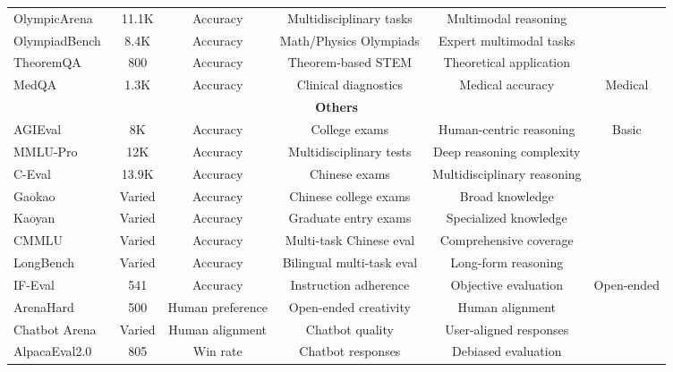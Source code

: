 \begin{table*}[!ht]
\begin{adjustbox}{width=\textwidth,keepaspectratio}
\begin{tabular}{lccccc}
OlympicArena~\citep{huang2024olympicarena} & 11.1K & Accuracy & Multidisciplinary tasks & Multimodal reasoning &  \\
OlympiadBench~\citep{he2024olympiadbench} & 8.4K & Accuracy & Math/Physics Olympiads & Expert multimodal tasks &  \\
TheoremQA~\citep{chen2023theoremqa} & 800 & Accuracy & Theorem-based STEM & Theoretical application &  \\
\midrule
MedQA~\citep{jin2020diseasedoespatienthave} & 1.3K & Accuracy & Clinical diagnostics & Medical accuracy & Medical \\
\midrule
\multicolumn{6}{c}{\textbf{Others}} \\
\midrule
AGIEval~\citep{zhong2024agieval} & 8K & Accuracy & College exams & Human-centric reasoning & \multirow{7}{*}{Basic} \\
MMLU-Pro~\citep{wang2024mmlupro} & 12K & Accuracy & Multidisciplinary tests & Deep reasoning complexity &  \\
C-Eval~\citep{huang2023ceval} & 13.9K & Accuracy & Chinese exams & Multidisciplinary reasoning &  \\
Gaokao~\citep{gaokao} & Varied & Accuracy & Chinese college exams & Broad knowledge & \\
Kaoyan~\citep{kaoyan} & Varied & Accuracy & Graduate entry exams & Specialized knowledge &  \\
CMMLU~\citep{li2024cmmlumeasuringmassivemultitask} & Varied & Accuracy & Multi-task Chinese eval & Comprehensive coverage &  \\
LongBench~\citep{bai2024longbenchbilingualmultitaskbenchmark} & Varied & Accuracy & Bilingual multi-task eval & Long-form reasoning &  \\
\midrule
IF-Eval~\citep{zhou2023instructionfollowing} & 541 & Accuracy & Instruction adherence & Objective evaluation & \multirow{4}{*}{Open-ended} \\
ArenaHard~\citep{li2024crowdsourceddatahighqualitybenchmarks} & 500 & Human preference & Open-ended creativity & Human alignment &  \\
Chatbot Arena~\citep{NEURIPS2023_91f18a12} & Varied & Human alignment & Chatbot quality & User-aligned responses &  \\
AlpacaEval2.0~\citep{dubois2024lengthcontrolledalpacaevalsimpleway} & 805 & Win rate & Chatbot responses & Debiased evaluation &  \\
\midrule


\end{tabular}
\end{adjustbox}
\end{table*}
